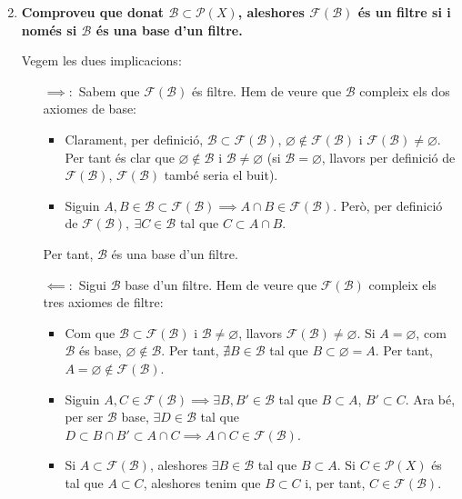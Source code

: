 \documentclass[10pt,a4paper]{article}
\begin{document}
\begin{enumerate}\setcounter{enumi}{1}
      \item\label{filtre-base} \textbf{Comproveu que donat $\mathcal{B}\subset \mathcal{P}(X)$, aleshores $\mathcal{F}(\mathcal{B})$ és un filtre si i només si $\mathcal{B}$ és una base d'un filtre.}

            Vegem les dues implicacions:
            \begin{itemize}[leftmargin=0.95cm]
                  \item [$\implies:$] Sabem que $\mathcal{F(B)}$ és filtre. Hem de veure que $\mathcal{B}$ compleix els dos axiomes de base:
                        \begin{itemize}
                              \item Clarament, per definició, $\mathcal{B \subset F(B)}$, $\varnothing \notin \mathcal{F(B)}$ i $\mathcal{F(B)}\neq\varnothing$. Per tant és clar que $\varnothing \notin \mathcal{B}$ i $\mathcal{B}\neq \varnothing$ (si $\mathcal{B}=\varnothing$, llavors per definició de $\mathcal{F(B)}$, $\mathcal{F(B)}$ també seria el buit).
                              \item Siguin $A, B \in \mathcal{B \subset F(B)} \implies A \cap B\in \mathcal{F(B)}$. Però, per definició de $\mathcal{F(B)}, \ \exists C\in \mathcal{B}$ tal que $C \subset A \cap B$.
                        \end{itemize}
                        Per tant, $\mathcal{B}$ és una base d'un filtre.
                  \item [$\impliedby:$] Sigui $\mathcal{B}$ base d'un filtre. Hem de veure que $\mathcal{F(B)}$ compleix els tres axiomes de filtre:
                        \begin{itemize}
                              \item Com que $\mathcal{B \subset F(B)}$ i $\mathcal{B}\ne \varnothing$, llavors $\mathcal{F(B)} \neq \varnothing$. Si $A=\varnothing$, com $\mathcal{B}$ és base, $\varnothing\notin\mathcal{B}$. Per tant, $\nexists B\in\mathcal{B}$ tal que $B\subset\varnothing=A$. Per tant, $A=\varnothing\notin\mathcal{F(B)}$.
                              \item Siguin $A, C \in \mathcal{F(B)} \implies \exists B, B' \in \mathcal{B}$ tal que $B \subset A$, $B' \subset C$. Ara bé, per ser $\mathcal{B}$ base, $\exists D\in \mathcal{B}$ tal que $D \subset B \cap B' \subset A \cap C \implies A \cap C\in \mathcal{F(B)}$.
                              \item Si $A \subset \mathcal{F(B)}$, aleshores $\exists B \in \mathcal{B}$ tal que $B \subset A$. Si $C \in \mathcal{P}(X)$ és tal que $A\subset C$, aleshores tenim que $B \subset C$ i, per tant, $C \in \mathcal{F(B)}$.

\end{itemize}
\end{itemize}
\end{enumerate}
\end{document}
